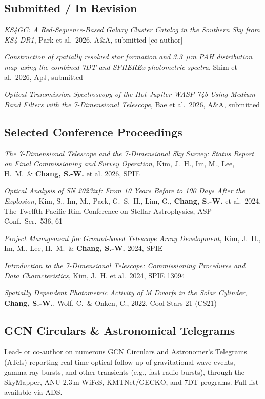 \documentclass[letterpaper,11pt]{article}
\begin{document}
\subsection*{Submitted / In Revision}
\begin{etaremune}
\item \emph{KS4GC: A Red-Sequence-Based Galaxy Cluster Catalog in the Southern Sky from
KS4 DR1}, Park et al.\ 2026, A\&A, submitted [co-author]
\item \emph{Construction of spatially resolved star formation and 3.3~$\mu$m PAH distribution map using the combined 7DT and SPHEREx photometric spectra}, Shim et al.\ 2026, ApJ, submitted
\item \emph{Optical Transmission Spectroscopy of the Hot Jupiter WASP-74b Using Medium-Band Filters with the 7-Dimensional Telescope}, Bae et al.\ 2026, A\&A, submitted

\end{etaremune}

\subsection*{Selected Conference Proceedings}
\begin{etaremune}
\item \emph{The 7-Dimensional Telescope and the 7-Dimensional Sky Survey: Status Report on Final Commissioning and Survey Operation}, Kim, J.~H., Im, M., Lee, H.~M.\ \& \textbf{Chang, S.-W.} et al. 2026, SPIE
\item \emph{Optical Analysis of SN 2023ixf: From 10 Years Before to 100 Days After the
Explosion}, Kim, S., Im, M., Paek, G.~S.~H., Lim, G., \textbf{Chang, S.-W.} et al.\ 2024,
The Twelfth Pacific Rim Conference on Stellar Astrophysics, ASP Conf.\ Ser.\ 536, 61
\item \emph{Project Management for Ground-based Telescope Array Development},
Kim, J.~H., Im, M., Lee, H.~M.\ \& \textbf{Chang, S.-W.} 2024, SPIE
\item \emph{Introduction to the 7-Dimensional Telescope: Commissioning Procedures and Data
Characteristics}, Kim, J.~H. et al.\ 2024, SPIE 13094
\item \emph{Spatially Dependent Photometric Activity of M Dwarfs in the Solar Cylinder},
\textbf{Chang, S.-W.}, Wolf, C.\ \& Onken, C., 2022, Cool Stars 21 (CS21)
\end{etaremune}

\subsection*{GCN Circulars \& Astronomical Telegrams}
Lead- or co-author on numerous GCN Circulars and Astronomer's Telegrams (ATels) reporting
real-time optical follow-up of gravitational-wave events, gamma-ray bursts, and other
transients (e.g., fast radio bursts), through the SkyMapper, ANU 2.3\,m
WiFeS, KMTNet/GECKO, and 7DT programs. Full list available via ADS.
\end{document}
